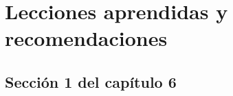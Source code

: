 
\chapter{Lecciones aprendidas y recomendaciones} %

\label{Chapter6} %



\section{Sección 1 del capítulo 6}